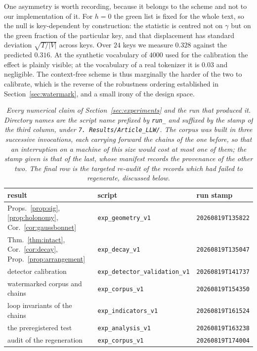 \documentclass[11pt,a4paper]{article}
\theoremstyle{plain}
\theoremstyle{definition}
\numberwithin{equation}{section}
\begin{document}
One asymmetry is worth recording, because it belongs to the scheme and
not to our implementation of it. For $h = 0$ the green list is fixed for
the whole text, so the null is key-dependent by construction: the
statistic is centred not on $\gamma$ but on the green fraction of the
particular key, and that displacement has standard deviation
$\sqrt{T/|V|}$ across keys. Over $24$ keys we measure $0.328$ against
the predicted $0.316$. At the synthetic vocabulary of $4000$ used for
the calibration the effect is plainly visible; at the vocabulary of a
real tokenizer it is $0.03$ and negligible. The context-free scheme is
thus marginally the harder of the two to calibrate, which is the reverse
of the robustness ordering established in Section~\ref{sec:watermark},
and a small irony of the design space.

\begin{table}[t]
\centering
\small
\begin{tabular}{lll}
\toprule
result & script & run stamp\\
\midrule
Props.~\ref{prop:sig}, \ref{prop:holonomy}, Cor.~\ref{cor:gaussbonnet}
  & \texttt{exp\_geometry\_v1} & \texttt{20260819T135822}\\
Thm.~\ref{thm:intact}, Cor.~\ref{cor:decay}, Prop.~\ref{prop:arrangement}
  & \texttt{exp\_decay\_v1} & \texttt{20260819T135047}\\
detector calibration
  & \texttt{exp\_detector\_validation\_v1} & \texttt{20260819T141737}\\
watermarked corpus and chains
  & \texttt{exp\_corpus\_v1} & \texttt{20260819T154350}\\
loop invariants of the chains
  & \texttt{exp\_indicators\_v1} & \texttt{20260819T161524}\\
the preregistered test
  & \texttt{exp\_analysis\_v1} & \texttt{20260819T163238}\\
audit of the regeneration
  & \texttt{exp\_corpus\_v1} & \texttt{20260819T174004}\\
\bottomrule
\end{tabular}
\caption{\emph{Every numerical claim of Section~\ref{sec:experiments}
and the run that produced it. Directory names are the script name
prefixed by \texttt{run\_} and suffixed by the stamp of the third
column, under \texttt{7.~Results/Article\_LLW/}. The corpus was built in
three successive invocations, each carrying forward the chains of the
one before, so that an interruption on a machine of this size would cost
at most one of them; the stamp given is that of the last, whose manifest
records the provenance of the other two. The final row is the targeted
re-audit of the records which had failed to regenerate, discussed
below.}}
\label{tab:runs}
\end{table}
\end{document}
